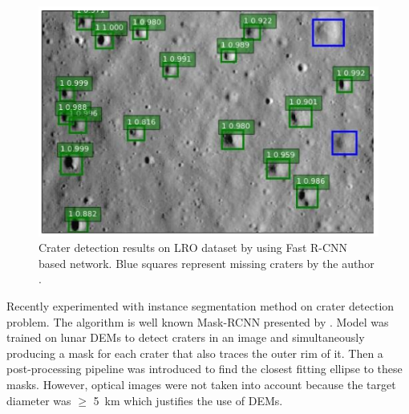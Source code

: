 \documentclass[11pt]{article}
\begin{document}
\begin{figure}[H]
	\centering
	\includegraphics[width=.6\linewidth]{files/literature/fastrcnn.png}
	\caption{Crater detection results on LRO dataset by using Fast R-CNN based network. Blue squares represent missing craters by the author \cite{emami2015automatic}.}
	\label{dem}
\end{figure}

Recently \cite{ali2019automated} experimented with instance segmentation method on crater detection problem. The algorithm is well known Mask-RCNN presented by \cite{he2017mask}. Model was trained on lunar DEMs to detect craters in an image and simultaneously producing a mask for each crater that also traces the outer rim of it. Then a post-processing pipeline was introduced to find the closest fitting ellipse to these masks. However, optical images were not taken into account because the target diameter was $\geq$ \SI{5}{km} which justifies the use of DEMs.

\end{document}
